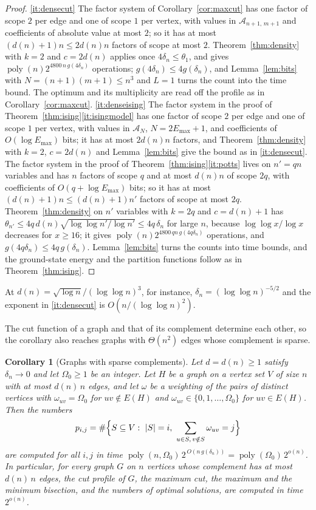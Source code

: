 \documentclass[11pt,reqno]{amsart}
\numberwithin{equation}{section}
\theoremstyle{plain}
\newtheorem{corollary}[theorem]{Corollary}
\theoremstyle{definition}
\theoremstyle{remark}
\DeclareMathOperator{\poly}{poly}
\newcommand{\A}{\mathcal{A}}
\begin{document}
\begin{proof}
\ref{it:densecut} The factor system of Corollary~\ref{cor:maxcut} has one factor
of scope $2$ per edge and one of scope $1$ per vertex, with values in
$\A_{n+1,\,m+1}$ and coefficients of absolute value at most $2$; so it has at
most $(d(n)+1)n\le2d(n)n$ factors of scope at most $2$. Theorem~\ref{thm:density}
with $k=2$ and $c=2d(n)$ applies once $4\delta_n\le\theta_1$, and gives
$\poly(n)2^{4800\,n\,g(4\delta_n)}$ operations; $g(4\delta_n)\le4g(\delta_n)$, and
Lemma~\ref{lem:bits} with $N=(n+1)(m+1)\le n^3$ and $L=1$ turns the count into the
time bound. The optimum and its multiplicity are read off the profile as in
Corollary~\ref{cor:maxcut}.
\ref{it:denseising} The factor system in the proof of Theorem~\ref{thm:ising}\ref{it:isingmodel}
has one factor of scope $2$ per edge and one of scope $1$ per vertex, with values
in $\A_N$, $N=2E_{\max}+1$, and coefficients of $O(\log E_{\max})$ bits; it has at
most $2d(n)n$ factors, and Theorem~\ref{thm:density} with $k=2$, $c=2d(n)$ and
Lemma~\ref{lem:bits} give the bound as in \ref{it:densecut}. The factor system
in the proof of Theorem~\ref{thm:ising}\ref{it:potts} lives on $n'=qn$ variables
and has $n$ factors of scope $q$ and at most $d(n)n$ of scope $2q$, with
coefficients of $O(q+\log E_{\max})$ bits; so it has at most
$(d(n)+1)n\le(d(n)+1)n'$ factors of scope at most $2q$. Theorem~\ref{thm:density}
on $n'$ variables with $k=2q$ and $c=d(n)+1$ has
$\theta_{n'}\le4q\,d(n)\sqrt{\log\log n'/\log n'}\le4q\,\delta_n$ for large $n$,
because $\log\log x/\log x$ decreases for $x\ge16$; it gives
$\poly(n)2^{4800\,qn\,g(4q\delta_n)}$ operations, and $g(4q\delta_n)\le4q\,g(\delta_n)$.
Lemma~\ref{lem:bits} turns the counts into time bounds, and the ground-state energy
and the partition functions follow as in Theorem~\ref{thm:ising}.
\end{proof}

At $d(n)=\sqrt{\log n}/(\log\log n)^3$, for instance, $\delta_n=(\log\log n)^{-5/2}$
and the exponent in \ref{it:densecut} is $O(n/(\log\log n)^2)$.

The cut function of a graph and that of its complement determine each other, so the
corollary also reaches graphs with $\Theta(n^2)$ edges whose complement is sparse.

\begin{corollary}[Graphs with sparse complements]\label{cor:complement}
Let $d=d(n)\ge1$ satisfy $\delta_n\to0$ and let $\Omega_0\ge1$ be an integer. Let
$H$ be a graph on a vertex set $V$ of size $n$ with at most $d(n)\,n$ edges, and let
$\omega$ be a weighting of the pairs of distinct vertices with $\omega_{uv}=\Omega_0$
for $uv\notin E(H)$ and $\omega_{uv}\in\{0,1,\dots,\Omega_0\}$ for $uv\in E(H)$. Then
the numbers
\[
  p_{i,j}=\#\Bigl\{S\subseteq V:\ |S|=i,\ \sum_{u\in S,\,v\notin S}\omega_{uv}=j\Bigr\}
\]
are computed for all $i,j$ in time $\poly(n,\Omega_0)\,2^{\,O(n\,g(\delta_n))}=\poly(\Omega_0)\,2^{o(n)}$.
In particular, for every graph $G$ on $n$ vertices whose complement has at most
$d(n)\,n$ edges, the cut profile of $G$, the maximum cut, the maximum and the
minimum bisection, and the numbers of optimal solutions, are computed in time
$2^{o(n)}$.
\end{corollary}
\end{document}
